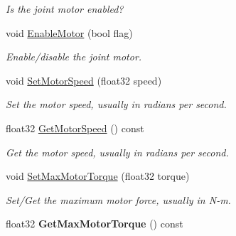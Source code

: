 \begin{DoxyCompactItemize}
\begin{DoxyCompactList}\small\item\em Is the joint motor enabled? \end{DoxyCompactList}\item 
void \hyperlink{classb2_wheel_joint_a7a832d814bdda135a78fad41ba671da6}{Enable\+Motor} (bool flag)\hypertarget{classb2_wheel_joint_a7a832d814bdda135a78fad41ba671da6}{}\label{classb2_wheel_joint_a7a832d814bdda135a78fad41ba671da6}

\begin{DoxyCompactList}\small\item\em Enable/disable the joint motor. \end{DoxyCompactList}\item 
void \hyperlink{classb2_wheel_joint_a6e3255fcf5c82b979ad7e3dc1c089c0b}{Set\+Motor\+Speed} (float32 speed)\hypertarget{classb2_wheel_joint_a6e3255fcf5c82b979ad7e3dc1c089c0b}{}\label{classb2_wheel_joint_a6e3255fcf5c82b979ad7e3dc1c089c0b}

\begin{DoxyCompactList}\small\item\em Set the motor speed, usually in radians per second. \end{DoxyCompactList}\item 
float32 \hyperlink{classb2_wheel_joint_acc7a31fdd444614ba1943f57f0c6ac5a}{Get\+Motor\+Speed} () const \hypertarget{classb2_wheel_joint_acc7a31fdd444614ba1943f57f0c6ac5a}{}\label{classb2_wheel_joint_acc7a31fdd444614ba1943f57f0c6ac5a}

\begin{DoxyCompactList}\small\item\em Get the motor speed, usually in radians per second. \end{DoxyCompactList}\item 
void \hyperlink{classb2_wheel_joint_a8aae3cd624ec9d48fc86c325c4595edc}{Set\+Max\+Motor\+Torque} (float32 torque)\hypertarget{classb2_wheel_joint_a8aae3cd624ec9d48fc86c325c4595edc}{}\label{classb2_wheel_joint_a8aae3cd624ec9d48fc86c325c4595edc}

\begin{DoxyCompactList}\small\item\em Set/\+Get the maximum motor force, usually in N-\/m. \end{DoxyCompactList}\item 
float32 {\bfseries Get\+Max\+Motor\+Torque} () const \hypertarget{classb2_wheel_joint_ad2d9fb270f0a62cd87234d3ce55626f3}{}\label{classb2_wheel_joint_ad2d9fb270f0a62cd87234d3ce55626f3}


\end{DoxyCompactItemize}
